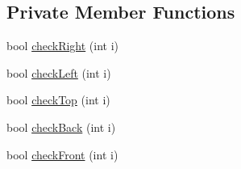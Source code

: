 \subsection*{Private Member Functions}
\begin{DoxyCompactItemize}
\item 
bool \hyperlink{classutils_1_1LCParticleContainer_a92ff40c48019c2f351edbbbd48453d15}{check\-Right} (int i)
\item 
bool \hyperlink{classutils_1_1LCParticleContainer_a074834f260290bde46dec2d1eece32a7}{check\-Left} (int i)
\item 
bool \hyperlink{classutils_1_1LCParticleContainer_a6921ef2bf21059fe1c95d8e828025c6f}{check\-Top} (int i)
\item 
bool \hyperlink{classutils_1_1LCParticleContainer_a942e57fc18c290dbe32ec81e88209669}{check\-Back} (int i)
\item 
bool \hyperlink{classutils_1_1LCParticleContainer_a0ed1dabac97f625e5560d1199af57677}{check\-Front} (int i)
\end{DoxyCompactItemize}
